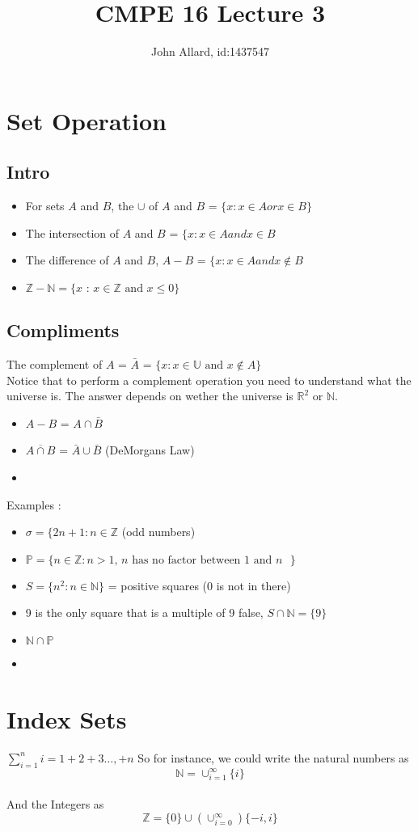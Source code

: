 \documentclass[a4paper,11pt]{article}
\title{ CMPE 16 Lecture 3}
\author{John Allard, id:1437547}
\begin{document}
\maketitle
\section{Set Operation}
\subsection{Intro}
\begin{itemize}
\item For sets  $A$ and $B$, the $\cup$ of $A$ and $B$ =  $\lbrace	x : x \in A or  x \in B \rbrace$  
\item The intersection of $A$ and $B$ = $\lbrace x : x\in A and x \in B$ 
\item The difference of $A$ and $B$, $A-B$ = $\lbrace x : x \in A and x \not\in B$ 
\item $\mathbb{Z}-\mathbb{N} = \lbrace x\text{ : }x \in \mathbb{Z} \text{ and } x \leq 0 \rbrace$
\end{itemize}

\subsection{Compliments}
The complement of $A$ = $\bar{A}$ = $ \lbrace x : x \in \mathbb{U} \text{ and } x \not\in A \rbrace $ \\
Notice that to perform a complement operation you need to understand what the universe is. The answer depends on wether the universe is $\mathbb{R}^2$ or $\mathbb{N}$. 
\begin{itemize}
\item $A-B$ = $A \cap \bar{B}$
\item $\overline{A \cap B}$ = $\bar{A} \cup \bar{B}$ (DeMorgans Law) 
\item 
\end{itemize}

Examples :
\begin{itemize}
\item $\sigma = \lbrace 2n+1 : n \in \mathbb{Z}$ (odd numbers)
\item $\mathbb{P} = \lbrace n \in \mathbb{Z} : n > 1 \text{, $n$ has no factor between 1 and  $n$ }\rbrace $
\item $ S = \lbrace n^2 : n \in \mathbb{N} \rbrace $ = positive squares (0 is not in there)
\item 9 is the only square that is a multiple of 9 false,  $S \cap \mathbb{N} = \lbrace 9 \rbrace $
\item $ \mathbb{N} \cap \mathbb{P} $
\item 
\end{itemize}


\section{Index Sets}
$\sum \limits_{i=1}^{n} i = 1+2+3 \ldots, + n$
So for instance, we could write the natural numbers as \[ \mathbb{N} = \cup_{i=1}^{\infty} \lbrace i \rbrace \] \\
And the Integers as \[\mathbb{Z} = \lbrace 0 \rbrace \cup ( \cup_{i=0}^{\infty}) \lbrace-i, i\rbrace \]
\end{document}
